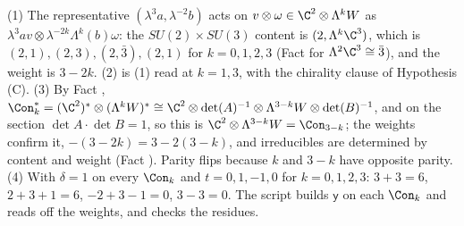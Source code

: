 (1) The representative $(\lambda^{3}a, \lambda^{-2}b)$ acts on $v \otimes \omega \in \C^{2} \otimes \Lambda^{k}W$ as $\lambda^{3}av \otimes \lambda^{-2k}\Lambda^{k}(b)\omega$: the $SU(2) \times SU(3)$ content is $(2, \Lambda^{k}\C^{3})$, which is $(2,1), (2,3), (2,\bar{3}), (2,1)$ for $k = 0, 1, 2, 3$ (Fact  for $\Lambda^{2}\C^{3} \cong \bar{3}$), and the weight is $3 - 2k$. (2) is (1) read at $k = 1, 3$, with the chirality clause of Hypothesis (C). (3) By Fact , $\Con_{k}^{*} = (\C^{2})^{*} \otimes (\Lambda^{k}W)^{*} \cong \C^{2} \otimes \det(A)^{-1} \otimes \Lambda^{3-k}W \otimes \det(B)^{-1}$, and on the section $\det A \cdot \det B = 1$, so this is $\C^{2} \otimes \Lambda^{3-k}W = \Con_{3-k}$; the weights confirm it, $-(3 - 2k) = 3 - 2(3-k)$, and irreducibles are determined by content and weight (Fact ). Parity flips because $k$ and $3 - k$ have opposite parity. (4) With $\delta = 1$ on every $\Con_{k}$ and $t = 0, 1, -1, 0$ for $k = 0, 1, 2, 3$: $3 + 3 = 6$, $2 + 3 + 1 = 6$, $-2 + 3 - 1 = 0$, $3 - 3 = 0$. The script builds $\mathsf{y}$ on each $\Con_{k}$ and reads off the weights, and checks the residues.
